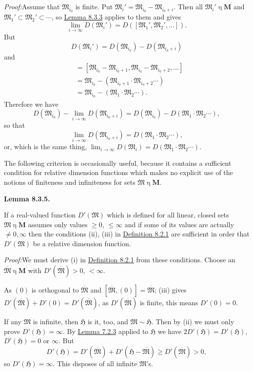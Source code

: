\documentclass[12pt,b5paper,twoside]{article}
\newcommand{\Hspace}{\mathfrak H}
\newcommand{\M}{\mathbf M}
\newcommand{\Lemma}[1]{%
  \par\smallskip\noindent\phantomsection\label{lem:#1}\textbf{Lemma #1.}\enspace
}
\newcommand{\Proof}{\par\noindent\textit{Proof:}\enspace}
\newcommand{\defref}[1]{\hyperref[def:#1]{Definition #1}}
\newcommand{\lemref}[1]{\hyperref[lem:#1]{Lemma #1}}
\begin{document}
\Proof Assume that $\mathfrak M_{i_0}$ is finite. Put
$\mathfrak M_i'=\mathfrak M_{i_0}-\mathfrak M_{i_0+i}$. Then all
$\mathfrak M_i'\mathbin\eta\M$ and
$\mathfrak M_1'\subset\mathfrak M_2'\subset\cdots$, so \lemref{8.3.3} applies
to them and gives
\[
 \lim_{i\to\infty}D(\mathfrak M_i')
 =D([\mathfrak M_1',\mathfrak M_2',\ldots]).
\]
But
\[
 D(\mathfrak M_i')=D(\mathfrak M_{i_0})-D(\mathfrak M_{i_0+i})
\]
and
\begin{align*}
 [\mathfrak M_1',\mathfrak M_2',\ldots]
 &=[\mathfrak M_{i_0}-\mathfrak M_{i_0+1},
     \mathfrak M_{i_0}-\mathfrak M_{i_0+2},\ldots]\\
 &=\mathfrak M_{i_0}-(\mathfrak M_{i_0+1}\cdot
     \mathfrak M_{i_0+2}\cdots)\\
 &=\mathfrak M_{i_0}-(\mathfrak M_1\cdot\mathfrak M_2\cdots).
\end{align*}
Therefore we have
\[
 D(\mathfrak M_{i_0})-\lim_{i\to\infty}D(\mathfrak M_{i_0+i})
 =D(\mathfrak M_{i_0})-D(\mathfrak M_1\cdot\mathfrak M_2\cdots),
\]
so that
\[
 \lim_{i\to\infty}D(\mathfrak M_{i_0+i})
 =D(\mathfrak M_1\cdot\mathfrak M_2\cdots),
\]
or, which is the same thing,
$\lim_{i\to\infty}D(\mathfrak M_i)=
D(\mathfrak M_1\cdot\mathfrak M_2\cdots)$.

The following criterion is occasionally useful, because it contains a sufficient
condition for relative dimension functions which makes no explicit use of the
notions of finiteness and infiniteness for sets $\mathfrak M\mathbin\eta\M$.

\Lemma{8.3.5}
If a real-valued function $D'(\mathfrak M)$ which is defined for all linear,
closed sets $\mathfrak M\mathbin\eta\M$ assumes only values
$\geq0$, $\leq\infty$ and if some of its values are actually $\ne0,\infty$ then
the conditions (ii), (iii) in \defref{8.2.1} are sufficient in order that
$D'(\mathfrak M)$ be a relative dimension function.

\Proof We must derive (i) in \defref{8.2.1} from these conditions. Choose an
$\overline{\mathfrak M}\mathbin\eta\M$ with
$D'(\overline{\mathfrak M})>0$, $<\infty$.

As $(0)$ is orthogonal to $\overline{\mathfrak M}$ and
$[\overline{\mathfrak M},(0)]=\overline{\mathfrak M}$; (iii) gives
$D'(\overline{\mathfrak M})+D'(0)=D'(\overline{\mathfrak M})$, as
$D'(\overline{\mathfrak M})$ is finite, this means $D'(0)=0$.

If any $\mathfrak M$ is infinite, then $\Hspace$ is it, too, and
$\mathfrak M\sim\Hspace$. Then by (ii) we must only prove
$D'(\Hspace)=\infty$. By \lemref{7.2.3} applied to $\Hspace$ we have
$2D'(\Hspace)=D'(\Hspace)$, $D'(\Hspace)=0$ or $\infty$. But
\[
 D'(\Hspace)=D'(\overline{\mathfrak M})
 +D'(\Hspace-\overline{\mathfrak M})
 \geq D'(\overline{\mathfrak M})>0,
\]
so $D'(\Hspace)=\infty$. This disposes of all infinite $\mathfrak M$'s.
\end{document}
